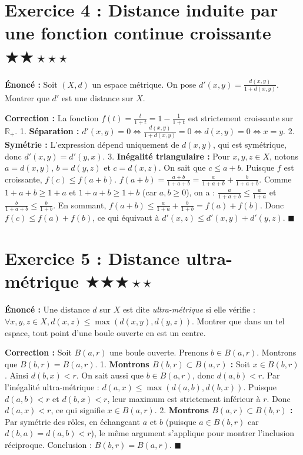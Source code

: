 \documentclass[11pt,a4paper]{article}
\begin{document}
\section*{Exercice 4 : Distance induite par une fonction continue croissante \quad $\bigstar\bigstar\star\star\star$}

\textbf{Énoncé :}
Soit $(X, d)$ un espace métrique. On pose $d'(x, y) = \frac{d(x, y)}{1 + d(x, y)}$.
Montrer que $d'$ est une distance sur $X$.

\textbf{Correction :}
La fonction $f(t) = \frac{t}{1+t} = 1 - \frac{1}{1+t}$ est strictement croissante sur $\mathbb{R}_+$.
1. \textbf{Séparation :}
   $d'(x,y) = 0 \iff \frac{d(x,y)}{1+d(x,y)} = 0 \iff d(x,y) = 0 \iff x = y$.
2. \textbf{Symétrie :}
   L'expression dépend uniquement de $d(x,y)$, qui est symétrique, donc $d'(x,y) = d'(y,x)$.
3. \textbf{Inégalité triangulaire :}
   Pour $x,y,z \in X$, notons $a=d(x,y)$, $b=d(y,z)$ et $c=d(x,z)$. On sait que $c \le a+b$.
   Puisque $f$ est croissante, $f(c) \le f(a+b)$.
   $f(a+b) = \frac{a+b}{1+a+b} = \frac{a}{1+a+b} + \frac{b}{1+a+b}$.
   Comme $1+a+b \ge 1+a$ et $1+a+b \ge 1+b$ (car $a,b \ge 0$), on a :
   $\frac{a}{1+a+b} \le \frac{a}{1+a}$ et $\frac{b}{1+a+b} \le \frac{b}{1+b}$.
   En sommant, $f(a+b) \le \frac{a}{1+a} + \frac{b}{1+b} = f(a) + f(b)$.
   Donc $f(c) \le f(a) + f(b)$, ce qui équivaut à $d'(x,z) \le d'(x,y) + d'(y,z)$. $\blacksquare$


\section*{Exercice 5 : Distance ultra-métrique \quad $\bigstar\bigstar\bigstar\star\star$}

\textbf{Énoncé :}
Une distance $d$ sur $X$ est dite \textit{ultra-métrique} si elle vérifie :
$\forall x,y,z \in X, d(x,z) \le \max(d(x,y), d(y,z))$.
Montrer que dans un tel espace, tout point d'une boule ouverte en est un centre.

\textbf{Correction :}
Soit $B(a, r)$ une boule ouverte. Prenons $b \in B(a, r)$. Montrons que $B(b, r) = B(a, r)$.
1. \textbf{Montrons $B(b, r) \subset B(a, r)$ :}
   Soit $x \in B(b, r)$. Ainsi $d(b, x) < r$.
   On sait aussi que $b \in B(a, r)$, donc $d(a, b) < r$.
   Par l'inégalité ultra-métrique :
   $d(a, x) \le \max(d(a, b), d(b, x))$.
   Puisque $d(a,b)<r$ et $d(b,x)<r$, leur maximum est strictement inférieur à $r$.
   Donc $d(a,x) < r$, ce qui signifie $x \in B(a, r)$.
2. \textbf{Montrons $B(a, r) \subset B(b, r)$ :}
   Par symétrie des rôles, en échangeant $a$ et $b$ (puisque $a \in B(b, r)$ car $d(b, a) = d(a, b) < r$), le même argument s'applique pour montrer l'inclusion réciproque.
Conclusion : $B(b, r) = B(a, r)$. $\blacksquare$
\end{document}
